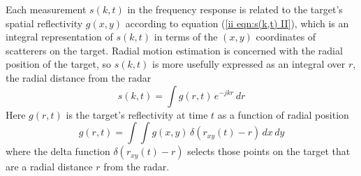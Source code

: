 Each measurement $s(k,t)$ in the frequency response is related to the
target's spatial reflectivity $g(x,y)$ according to equation (\ref{ii
eqn:s(k,t) II}), which is an integral representation of $s(k,t)$ in terms of
the $(x,y)$ coordinates of scatterers on the target.  Radial motion
estimation is concerned with the radial position of the target, so $s(k,t)$
is more usefully expressed as an integral over $r$, the radial distance 
from the radar
\begin{equation}\label{mc eqn:s(k,t) via g(r,t)}
s(k,t)=\int g(r,t)\,e^{-jkr}\,dr
\end{equation}
Here $g(r,t)$ is the target's reflectivity at time $t$ as a function of 
radial position
\begin{equation}\label{mc eqn:g(r,t)}
g(r,t)=\int\!\!\int g(x,y)\,\delta(r_{xy}(t)-r)\,dx\,dy
\end{equation}
where the delta function $\delta(r_{xy}(t)-r)$ selects those points on the
target that are a radial distance $r$ from the radar.

